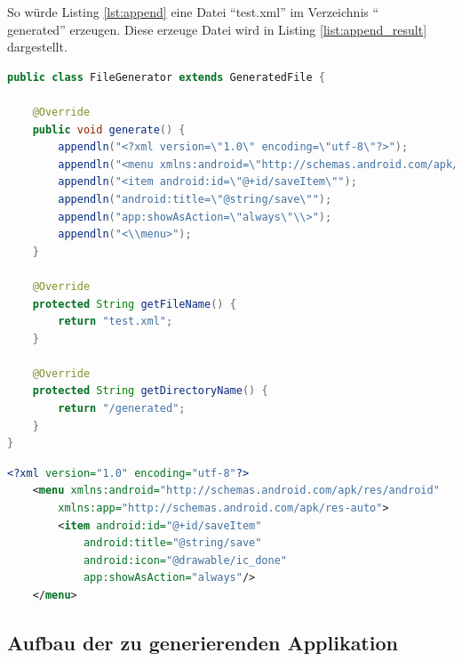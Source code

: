 So würde Listing \ref{lst:append} eine Datei \enquote{test.xml} im Verzeichnis \enquote{\\generated} erzeugen. Diese erzeuge Datei wird in Listing \ref{list:append_result} dargestellt.

\begin{lstlisting}[label=lst:append,
language=java,
firstnumber=1,
caption=Beispiel eine GeneratedFile-Instanz zur Erzeugung einer XML-Datei]				   
public class FileGenerator extends GeneratedFile {

	@Override
	public void generate() {
		appendln("<?xml version=\"1.0\" encoding=\"utf-8\"?>");
		appendln("<menu xmlns:android=\"http://schemas.android.com/apk/res/android\" xmlns:app=\"http://schemas.android.com/apk/res-auto\">");
		appendln("<item android:id=\"@+id/saveItem\"");
		appendln("android:title=\"@string/save\"");
		appendln("app:showAsAction=\"always\"\\>");
		appendln("<\\menu>");
	}

	@Override
	protected String getFileName() {
		return "test.xml";
	}

	@Override
	protected String getDirectoryName() {
		return "/generated";
	}
}
\end{lstlisting}

\begin{lstlisting}[label=lst:append_result,
language=xml,
firstnumber=1,
caption=Beispiel für einen Quelltext]				   
<?xml version="1.0" encoding="utf-8"?>
	<menu xmlns:android="http://schemas.android.com/apk/res/android"
		xmlns:app="http://schemas.android.com/apk/res-auto">
		<item android:id="@+id/saveItem"
			android:title="@string/save"
			android:icon="@drawable/ic_done"
			app:showAsAction="always"/>
	</menu>
\end{lstlisting}

\subsection{Aufbau der zu generierenden Applikation}

